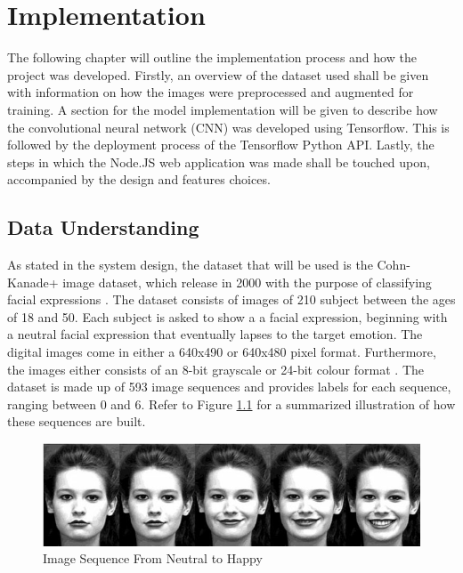 \chapter{Implementation}
The following chapter will outline the implementation process and how the project was developed. Firstly, an overview of the dataset used shall be given with information on how the images were preprocessed and augmented for training. A section for the model implementation will be given to describe how the convolutional neural network (CNN) was developed using Tensorflow. This is followed by the deployment process of the Tensorflow Python API. Lastly, the steps in which the Node.JS web application was made shall be touched upon, accompanied by the design and features choices.

\section{Data Understanding}
As stated in the system design, the dataset that will be used is the Cohn-Kanade+ image dataset, which release in 2000 with the purpose of classifying facial expressions \citep{ck}. The dataset consists of images of 210 subject between the ages of 18 and 50. Each subject is asked to show a a facial expression, beginning with a neutral facial expression that eventually lapses to the target emotion. The digital images come in either a 640x490 or 640x480 pixel format. Furthermore, the images either consists of an 8-bit grayscale or 24-bit colour format \citep{ck}. The dataset is made up of 593 image sequences and provides labels for each sequence, ranging between 0 and 6. Refer to Figure \ref{seq} for a summarized illustration of how these sequences are built.

\begin{figure}[ht]
	\begin{center}
		\advance\leftskip-3cm
		\advance\rightskip-3cm
		\includegraphics[keepaspectratio=true,scale=0.6]{__resources/DATASET/sequence.png}
		\caption{Image Sequence From Neutral to Happy}
		\label{seq}
	\end{center}
\end{figure}

